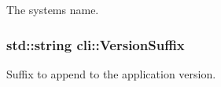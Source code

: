 The system\textquotesingle{}s name. 

\subsubsection[{\texorpdfstring{Version\+Suffix}{VersionSuffix}}]{\setlength{\rightskip}{0pt plus 5cm}std\+::string cli\+::\+Version\+Suffix\hspace{0.3cm}{\ttfamily [static]}}\hypertarget{namespacecli_a8f1472913c8063fd02c6e81c4cd1ce12}{}\label{namespacecli_a8f1472913c8063fd02c6e81c4cd1ce12}


Suffix to append to the application version. 

